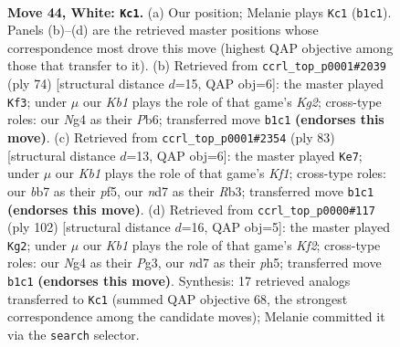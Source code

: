 \documentclass[11pt]{article}
\begin{document}
\clearpage

\begin{figure}[p]\centering
\begin{subfigure}{0.46\textwidth}\centering
\resizebox{\linewidth}{!}{%
\newchessgame
\chessboard[
  setfen={8/1b1n3k/8/8/p2p2N1/P5P1/1PP5/1K6 w - - 6 44},
  showmover=false,
  pgfstyle=straightmove, color=movearrow, markmove={b1-c1}
]}
\caption{}
\end{subfigure}\hfill
\begin{subfigure}{0.46\textwidth}\centering
\resizebox{\linewidth}{!}{%
\newchessgame
\chessboard[
  setfen={3n2k1/8/1P4p1/7p/7P/6P1/5PK1/8 w - - 1 38},
  showmover=false,
  pgfstyle=straightmove, color=movearrow, markmove={g2-f3}
]}
\caption{}
\end{subfigure}
\\[4pt]
\begin{subfigure}{0.46\textwidth}\centering
\resizebox{\linewidth}{!}{%
\newchessgame
\chessboard[
  setfen={5k2/5pp1/7p/3pPP2/6P1/1r6/5K2/R7 b - - 1 42},
  showmover=false,
  pgfstyle=straightmove, color=movearrow, markmove={f8-e7}
]}
\caption{}
\end{subfigure}\hfill
\begin{subfigure}{0.46\textwidth}\centering
\resizebox{\linewidth}{!}{%
\newchessgame
\chessboard[
  setfen={8/p7/3k4/1p3p1p/1P5P/P3P1P1/5K2/8 w - - 20 52},
  showmover=false,
  pgfstyle=straightmove, color=movearrow, markmove={f2-g2}
]}
\caption{}
\end{subfigure}
\caption{\textbf{Move 44, White: \texttt{Kc1}.} (a) Our position; Melanie plays \texttt{Kc1} (\texttt{b1c1}). Panels (b)--(d) are the retrieved master positions whose correspondence most drove this move (highest QAP objective among those that transfer to it). (b) Retrieved from \texttt{ccrl\_top\_p0001\#2039} (ply 74) [structural distance $d$=15, QAP obj=6]: the master played \texttt{Kf3}; under $\mu$ our \emph{Kb1} plays the role of that game's \emph{Kg2}; cross-type roles: our \emph{N}g4 as their \emph{P}b6; transferred move \texttt{b1c1} \textbf{(endorses this move)}. (c) Retrieved from \texttt{ccrl\_top\_p0001\#2354} (ply 83) [structural distance $d$=13, QAP obj=6]: the master played \texttt{Ke7}; under $\mu$ our \emph{Kb1} plays the role of that game's \emph{Kf1}; cross-type roles: our \emph{b}b7 as their \emph{p}f5, our \emph{n}d7 as their \emph{R}b3; transferred move \texttt{b1c1} \textbf{(endorses this move)}. (d) Retrieved from \texttt{ccrl\_top\_p0000\#117} (ply 102) [structural distance $d$=16, QAP obj=5]: the master played \texttt{Kg2}; under $\mu$ our \emph{Kb1} plays the role of that game's \emph{Kf2}; cross-type roles: our \emph{N}g4 as their \emph{P}g3, our \emph{n}d7 as their \emph{p}h5; transferred move \texttt{b1c1} \textbf{(endorses this move)}. Synthesis: 17 retrieved analogs transferred to \texttt{Kc1} (summed QAP objective 68, the strongest correspondence among the candidate moves); Melanie committed it via the \texttt{search} selector.}
\label{fig:thought-m86}
\end{figure}
\end{document}
